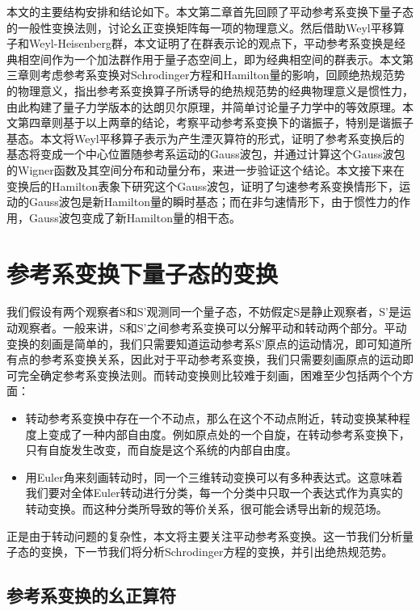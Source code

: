 \documentclass[a4paper]{article}
\begin{document}
        本文的主要结构安排和结论如下。本文第二章首先回顾了平动参考系变换下量子态的一般性变换法则，讨论幺正变换矩阵每一项的物理意义。然后借助Weyl平移算子和Weyl-Heisenberg群，本文证明了在群表示论的观点下，平动参考系变换是经典相空间作为一个加法群作用于量子态空间上，即为经典相空间的群表示。本文第三章则考虑参考系变换对Schrodinger方程和Hamilton量的影响，回顾绝热规范势的物理意义，指出参考系变换算子所诱导的绝热规范势的经典物理意义是惯性力，由此构建了量子力学版本的达朗贝尔原理，并简单讨论量子力学中的等效原理。本文第四章则基于以上两章的结论，考察平动参考系变换下的谐振子，特别是谐振子基态。本文将Weyl平移算子表示为产生湮灭算符的形式，证明了参考系变换后的基态将变成一个中心位置随参考系运动的Gauss波包，并通过计算这个Gauss波包的Wigner函数及其空间分布和动量分布，来进一步验证这个结论。本文接下来在变换后的Hamilton表象下研究这个Gauss波包，证明了匀速参考系变换情形下，运动的Gauss波包是新Hamilton量的瞬时基态；而在非匀速情形下，由于惯性力的作用，Gauss波包变成了新Hamilton量的相干态。



    \section{参考系变换下量子态的变换}

        我们假设有两个观察者S和S'观测同一个量子态，不妨假定S是静止观察者，S'是运动观察者。一般来讲，S和S'之间参考系变换可以分解平动和转动两个部分。平动变换的刻画是简单的，我们只需要知道运动参考系S'原点的运动情况，即可知道所有点的参考系变换关系，因此对于平动参考系变换，我们只需要刻画原点的运动即可完全确定参考系变换法则。而转动变换则比较难于刻画，困难至少包括两个个方面：
            
        \begin{itemize}
            \item 转动参考系变换中存在一个不动点，那么在这个不动点附近，转动变换某种程度上变成了一种内部自由度。例如原点处的一个自旋，在转动参考系变换下，只有自旋发生改变，而自旋是这个系统的内部自由度。
            \item 用Euler角来刻画转动时，同一个三维转动变换可以有多种表达式。这意味着我们要对全体Euler转动进行分类，每一个分类中只取一个表达式作为真实的转动变换。而这种分类所导致的等价关系，很可能会诱导出新的规范场。
        \end{itemize}
        
        正是由于转动问题的复杂性，本文将主要关注平动参考系变换。这一节我们分析量子态的变换，下一节我们将分析Schrodinger方程的变换，并引出绝热规范势。


    \subsection{参考系变换的幺正算符}
    
\end{document}
